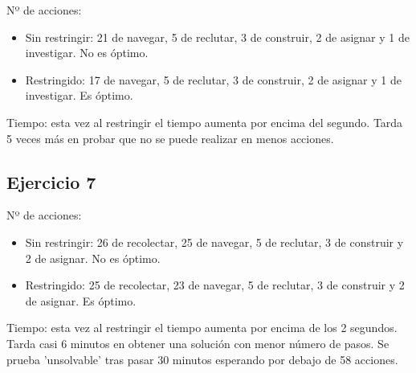 

Nº de acciones: 
\begin{itemize}
	\item Sin restringir: 21 de navegar, 5 de reclutar, 3 de construir, 2 de asignar y 1 de investigar. No es óptimo.
	\item Restringido: 17 de navegar, 5 de reclutar, 3 de construir, 2 de asignar y 1 de investigar. Es óptimo.
\end{itemize}

Tiempo: esta vez al restringir el tiempo aumenta por encima del segundo. Tarda 5 veces más en probar que no se puede realizar en menos acciones.

\subsection{Ejercicio 7}
\noindent{}


Nº de acciones: 
\begin{itemize}
	\item Sin restringir: 26 de recolectar, 25 de navegar, 5 de reclutar, 3 de construir y 2 de asignar. No es óptimo.
	\item Restringido: 25 de recolectar, 23 de navegar, 5 de reclutar, 3 de construir y 2 de asignar. Es óptimo.
\end{itemize}

Tiempo: esta vez al restringir el tiempo aumenta por encima de los 2 segundos. Tarda casi 6 minutos en obtener una solución con menor número de pasos. Se prueba 'unsolvable' tras pasar 30 minutos esperando por debajo de 58 acciones.

%



